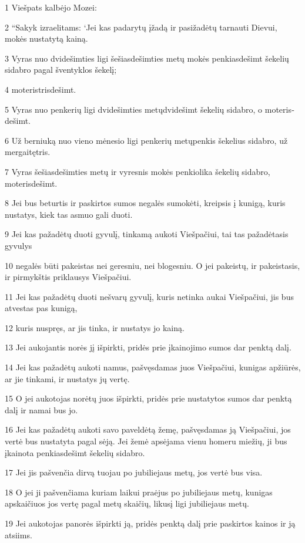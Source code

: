 \par 1 Viešpats kalbėjo Mozei: 
\par 2 “Sakyk izraelitams: ‘Jei kas padarytų įžadą ir pasižadėtų tarnauti Dievui, mokės nustatytą kainą. 
\par 3 Vyras nuo dvidešimties ligi šešiasdešimties metų mokės penkiasdešimt šekelių sidabro pagal šventyklos šekelį; 
\par 4 moteris­trisdešimt. 
\par 5 Vyras nuo penkerių ligi dvidešimties metų­dvidešimt šekelių sidabro, o moteris­dešimt. 
\par 6 Už berniuką nuo vieno mėnesio ligi penkerių metų­penkis šekelius sidabro, už mergaitę­tris. 
\par 7 Vyras šešiasdešimties metų ir vyresnis mokės penkiolika šekelių sidabro, moteris­dešimt. 
\par 8 Jei bus beturtis ir paskirtos sumos negalės sumokėti, kreipsis į kunigą, kuris nustatys, kiek tas asmuo gali duoti. 
\par 9 Jei kas pažadėtų duoti gyvulį, tinkamą aukoti Viešpačiui, tai tas pažadėtasis gyvulys 
\par 10 negalės būti pakeistas nei geresniu, nei blogesniu. O jei pakeistų, ir pakeistasis, ir pirmykštis priklausys Viešpačiui. 
\par 11 Jei kas pažadėtų duoti nešvarų gyvulį, kuris netinka aukai Viešpačiui, jis bus atvestas pas kunigą, 
\par 12 kuris nuspręs, ar jis tinka, ir nustatys jo kainą. 
\par 13 Jei aukojantis norės jį išpirkti, pridės prie įkainojimo sumos dar penktą dalį. 
\par 14 Jei kas pažadėtų aukoti namus, pašvęsdamas juos Viešpačiui, kunigas apžiūrės, ar jie tinkami, ir nustatys jų vertę. 
\par 15 O jei aukotojas norėtų juos išpirkti, pridės prie nustatytos sumos dar penktą dalį ir namai bus jo. 
\par 16 Jei kas pažadėtų aukoti savo paveldėtą žemę, pašvęsdamas ją Viešpačiui, jos vertė bus nustatyta pagal sėją. Jei žemė apsėjama vienu homeru miežių, ji bus įkainota penkiasdešimt šekelių sidabro. 
\par 17 Jei jis pašvenčia dirvą tuojau po jubiliejaus metų, jos vertė bus visa. 
\par 18 O jei ji pašvenčiama kuriam laikui praėjus po jubiliejaus metų, kunigas apskaičiuos jos vertę pagal metų skaičių, likusį ligi jubiliejaus metų. 
\par 19 Jei aukotojas panorės išpirkti ją, pridės penktą dalį prie paskirtos kainos ir ją atsiims. 
